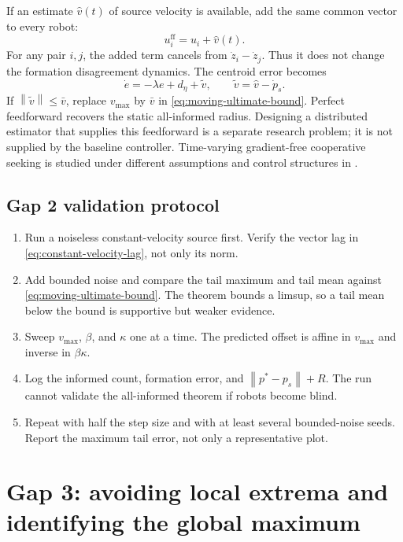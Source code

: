 \documentclass[11pt]{article}
\newcommand{\norm}[1]{\left\lVert #1\right\rVert}
\newcommand{\NotationContext}[1]{\markboth{#1}{#1}}
\begin{document}
If an estimate $\hat v(t)$ of source velocity is available, add the same common vector to every robot:
\begin{equation}\label{eq:feedforward-controller}
    u_i^{\mathrm{ff}}=u_i+\hat v(t).
\end{equation}
For any pair $i,j$, the added term cancels from $\dot z_i-\dot z_j$. Thus it does not change the formation disagreement dynamics. The centroid error becomes
\begin{equation}\label{eq:feedforward-error}
    \dot e=-\lambda e+d_\eta+\tilde v,
    \qquad\tilde v=\hat v-\dot p_s.
\end{equation}
If $\norm{\tilde v}\leq\bar v$, replace $v_{\max}$ by $\bar v$ in \eqref{eq:moving-ultimate-bound}. Perfect feedforward recovers the static all-informed radius. Designing a distributed estimator that supplies this feedforward is a separate research problem; it is not supplied by the baseline controller. Time-varying gradient-free cooperative seeking is studied under different assumptions and control structures in \cite{michael2023}.

\subsection{Gap 2 validation protocol}\label{sec:gap2-validation}

\begin{enumerate}
    \item Run a noiseless constant-velocity source first. Verify the vector lag in \eqref{eq:constant-velocity-lag}, not only its norm.
    \item Add bounded noise and compare the tail maximum and tail mean against \eqref{eq:moving-ultimate-bound}. The theorem bounds a limsup, so a tail mean below the bound is supportive but weaker evidence.
    \item Sweep $v_{\max}$, $\beta$, and $\kappa$ one at a time. The predicted offset is affine in $v_{\max}$ and inverse in $\beta\kappa$.
    \item Log the informed count, formation error, and $\norm{p^*-p_s}+R$. The run cannot validate the all-informed theorem if robots become blind.
    \item Repeat with half the step size and with at least several bounded-noise seeds. Report the maximum tail error, not only a representative plot.
\end{enumerate}

\section{Gap 3: avoiding local extrema and identifying the global maximum}\label{sec:gap3}
\NotationContext{field}
\end{document}
